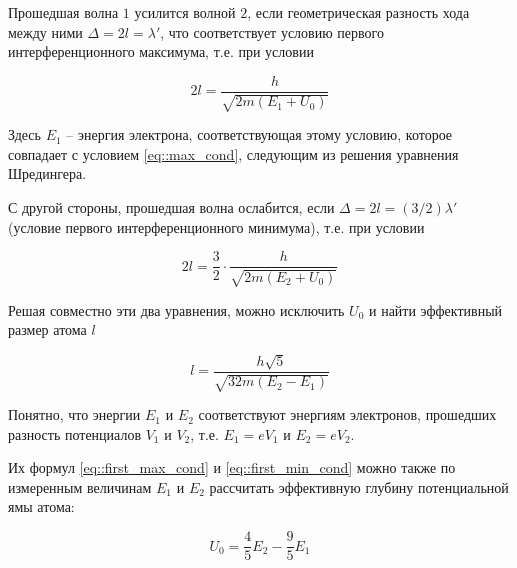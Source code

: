 Прошедшая волна $1$ усилится волной $2$, если геометрическая разность хода между
ними $\Delta = 2l = \lambda'$, что соответствует условию первого
интерференционного максимума, т.е. при условии

\begin{equation} \label{eq::first_max_cond}
  2l = \frac{h}{\sqrt{2m(E_1 + U_0)}}
\end{equation}

Здесь $E_1$ -- энергия электрона, соответствующая этому условию, которое
совпадает с условием \eqref{eq::max_cond}, следующим из решения уравнения
Шредингера.

С другой стороны, прошедшая волна ослабится, если $\Delta = 2l = (3/2)\lambda'$
(условие первого интерференционного минимума), т.е. при условии

\begin{equation} \label{eq::first_min_cond}
  2l = \frac{3}{2} \cdot \frac{h}{\sqrt{2m(E_2 + U_0)}}
\end{equation}

Решая совместно эти два уравнения, можно исключить $U_0$ и найти эффективный
размер атома $l$

\begin{equation}\label{eq::l_3}
  l = \frac{h \sqrt{5}}{\sqrt{32m(E_2 - E_1)}}
\end{equation}

Понятно, что энергии $E_1$ и $E_2$ соответствуют энергиям электронов, прошедших
разность потенциалов $V_1$ и $V_2$, т.е. $E_1 = e V_1$ и $E_2 = e V_2$.

Их формул \eqref{eq::first_max_cond} и \eqref{eq::first_min_cond} можно также по
измеренным величинам $E_1$ и $E_2$ рассчитать эффективную глубину потенциальной
ямы атома:

\begin{equation}\label{eq::Umin}
  U_0 = \frac{4}{5} E_2 - \frac{9}{5} E_1
\end{equation}
